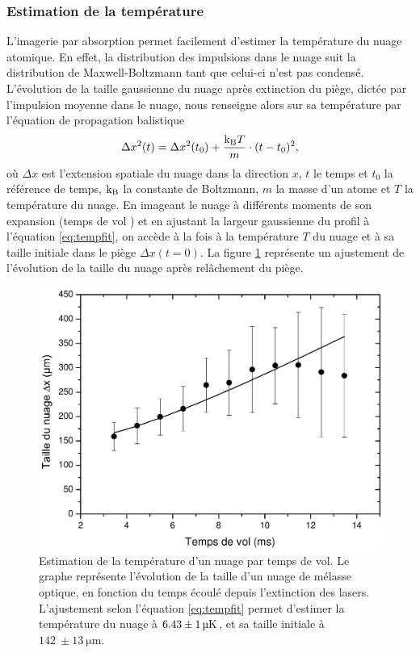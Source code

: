	\subsubsection*{Estimation de la température}
\noindent L'imagerie par absorption permet facilement d'estimer la température du nuage atomique.
En effet, la distribution des impulsions dans le nuage suit la distribution de Maxwell-Boltzmann tant que celui-ci n'est pas condensé.
L'évolution de la taille gaussienne du nuage après extinction du piège, dictée par l'impulsion moyenne dans le nuage,  nous renseigne alors sur sa température par l'équation de propagation balistique
\begin{equation}
\label{eq:tempfit}
\Delta x^2 (t) = \Delta x^2(t_0) + \frac{\mathrm{k_B} T}{m} \cdot (t-t_0)^2,
\end{equation}
où $\Delta x$ est l'extension spatiale du nuage dans la direction $x$, $t$ le temps et $t_0$ la référence de temps, $\mathrm{k_B}$ la constante de Boltzmann, $m$ la masse d'un atome et $T$ la température du nuage.
En imageant le nuage à différents moments de son expansion (\og temps de vol \fg{}) et en ajustant la largeur gaussienne du profil à l'équation \eqref{eq:tempfit}, on accède à la fois à la température $T$ du nuage et à sa taille initiale dans le piège $\Delta x(t=0)$.
La figure \ref{fig:Tempfit} représente un ajustement de l'évolution de la taille du nuage après relâchement du piège.
%
\begin{figure}[!h]
\centering
\includegraphics[width=.6\linewidth]{figures/setup/coldatoms/Tempfit}
\caption[Estimation de la température d'un nuage par temps de vol]{
Estimation de la température d'un nuage par temps de vol.
Le graphe représente l'évolution de la taille d'un nuage de mélasse optique, en fonction du temps écoulé depuis l'extinction des lasers.
L'ajustement selon l'équation \eqref{eq:tempfit} permet d'estimer la température du nuage à $\SI{6.43}{} \pm\SI{1}{\si{\micro\kelvin}}$, et sa taille initiale à $\SI{142}{} \pm \SI{13}{\um}$.
}
\label{fig:Tempfit}
\end{figure}
		
